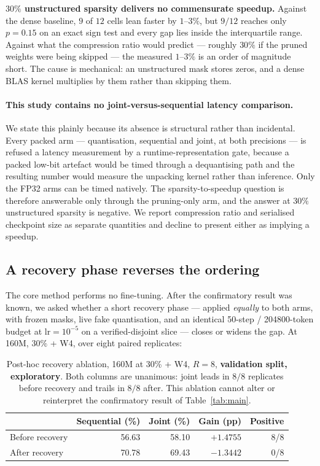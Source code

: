 \textbf{$30\%$ unstructured sparsity delivers no commensurate speedup.} Against the dense
baseline, $9$ of $12$ cells lean faster by $1$--$3\%$, but $9/12$ reaches only $p = 0.15$ on
an exact sign test and every gap lies inside the interquartile range. Against what the
compression ratio would predict --- roughly $30\%$ if the pruned weights were being skipped
--- the measured $1$--$3\%$ is an order of magnitude short. The cause is mechanical: an
unstructured mask stores zeros, and a dense BLAS kernel multiplies by them rather than
skipping them.

\paragraph{This study contains no joint-versus-sequential latency comparison.} We state this
plainly because its absence is structural rather than incidental. Every packed arm ---
quantisation, sequential and joint, at both precisions --- is refused a latency measurement
by a runtime-representation gate, because a packed low-bit artefact would be timed through a
dequantising path and the resulting number would measure the unpacking kernel rather than
inference. Only the FP32 arms can be timed natively. The sparsity-to-speedup question is
therefore answerable only through the pruning-only arm, and the answer at $30\%$ unstructured
sparsity is negative. We report compression ratio and serialised checkpoint size as separate
quantities and decline to present either as implying a speedup.

\subsection{A recovery phase reverses the ordering}
\label{subsec:recoveryresult}

The core method performs no fine-tuning. After the confirmatory result was known, we asked
whether a short recovery phase --- applied \emph{equally} to both arms, with frozen masks,
live fake quantisation, and an identical 50-step / \num{204800}-token budget at
$\mathrm{lr} = 10^{-5}$ on a verified-disjoint slice --- closes or widens the gap. At 160M,
$30\%$ + W4, over eight paired replicates:

\begin{table}[t]
\centering
\caption{Post-hoc recovery ablation, 160M at 30\% + W4, $R{=}8$, \textbf{validation split,
exploratory}. Both columns are unanimous: joint leads in $8/8$ replicates before recovery and
trails in $8/8$ after. This ablation cannot alter or reinterpret the confirmatory result of
Table~\ref{tab:main}.}
\label{tab:recovery}
\begin{tabular}{@{}lrrrr@{}}
\toprule
& \textbf{Sequential (\%)} & \textbf{Joint (\%)} & \textbf{Gain (pp)} & \textbf{Positive} \\
\midrule
Before recovery & 56.63 & 58.10 & $+1.4755$ & 8/8 \\
After recovery  & 70.78 & 69.43 & $-1.3442$ & 0/8 \\
\bottomrule
\end{tabular}
\end{table}

